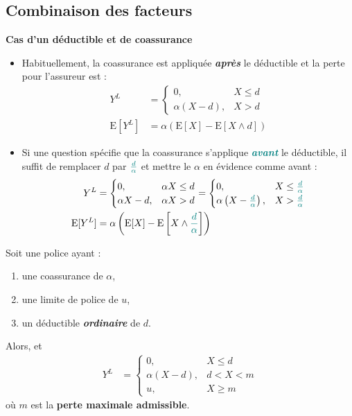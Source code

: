 \documentclass[10pt, french]{article}
\begin{document}
\begin{multicols*}{2}
\subsection{Combinaison des facteurs}
\textbf{Cas d'un déductible et de coassurance}
\begin{itemize}
	\item	Habituellement, la coassurance est appliquée \textit{\textbf{après}} le déductible et la perte pour l'assureur est :
		\begin{align*}
		Y^{L}
		&=	\begin{cases}
			0,	&	X \leq d	\\
			\alpha(X - d),	&	X > d
			\end{cases}	\\
		\text{E}[Y^{L}]	
		&=	\alpha\left(\text{E}[X]	-	\text{E}[X \wedge d]	\right)
		\end{align*}
	\item	Si une question spécifie que la coassurance s'applique \textit{\textbf{\textcolor{teal}{avant}}} le déductible, il suffit de remplacer $d$ par $\textcolor{teal}{\frac{d}{\alpha}}$ et mettre le $\alpha$ en évidence comme avant :
		\begin{align*}
		Y^{L}
		&=	\begin{cases}
			0,	&	\alpha X \leq d	\\
			\alpha X - d,	&	\alpha X > d
			\end{cases}	
		=	\begin{cases}
			0,	&	X \leq \textcolor{teal}{\frac{d}{\alpha}}	\\
			\alpha\left(X - \textcolor{teal}{\frac{d}{\alpha}}\right),	&	X > \textcolor{teal}{\frac{d}{\alpha}}
			\end{cases}	\\
		\text{E}[Y^{L}]	
		&=	\alpha\left(\text{E}[X]	-	\text{E}\left[X \wedge \textcolor{teal}{\frac{d}{\alpha}}\right]	\right)
		\end{align*}
\end{itemize}

Soit une police ayant : 
\begin{enumerate}
	\item	une coassurance de $\alpha$,
	\item	une limite de police de $u$,
	\item	un déductible \textit{\textbf{ordinaire}} de $d$.
\end{enumerate}

Alors,  et 
\begin{align*}
	Y^{L}
	&=	\begin{cases}
		0, 	&	X \leq d	\\
		\alpha (X - d), 	&	d < X < m	\\
		u, 	&	X \geq m	
		\end{cases}
\end{align*}
où $m$ est la \textbf{perte maximale admissible}.


\end{multicols*}
\end{document}
